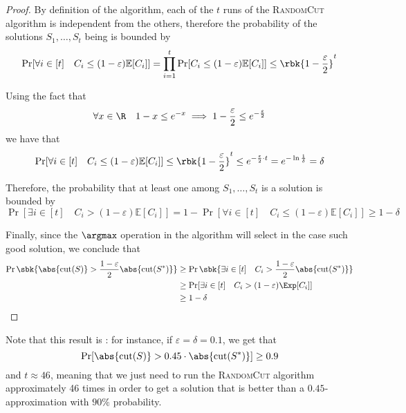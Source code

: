 \documentclass[a4paper, 12pt]{report}
\begin{document}
\begin{proof}
        By definition of the algorithm, each of the $t$ runs of the \textsc{RandomCut} algorithm is independent from the others, therefore the probability of  the solutions $S_1, \ldots, S_t$ being  is bounded by $$\Pr[\forall i \in [t]  \quad C_i \le (1 - \varepsilon) \mathbb E [C_i]] = \prod_{i = 1}^t{\Pr[C_i \le (1 - \varepsilon)\mathbb E[C_i]]} \le \rbk{1 - \dfrac{\varepsilon}{2}}^t$$

        Using the fact that $$\forall x \in \R \quad 1 - x \le e^{-x} \implies 1 - \frac{\varepsilon}{2} \le e^{- \frac{\varepsilon}{2}}$$ we have that $$\Pr[\forall i \in [t] \quad C_i \le (1 - \varepsilon) \mathbb E[C_i]] \le \rbk{1 - \dfrac{\varepsilon}{2}}^t \le e^{- \frac{\varepsilon}{2} \cdot t} = e^{- \ln {\frac{1}{\delta}}} = \delta$$

        Therefore, the probability that at least one among $S_1, \ldots, S_t$ is a  solution is bounded by $$\Pr[\exists i \in [t] \quad C_i > (1 - \varepsilon) \mathbb E [C_i]] = 1 - \Pr[\forall i \in [t] \quad C_i \le (1 - \varepsilon) \mathbb E [C_i]] \ge 1 - \delta$$

        Finally, since the $\argmax$ operation in the algorithm will select in the  case such good solution, we conclude that
        \begin{equation*}
            \begin{split}
                \Pr \sbk{\abs{\mathrm{cut}(S)} > \dfrac{1 - \varepsilon}{2} \abs{\mathrm{cut}(S^*)}} &\ge \Pr \sbk {\exists i \in [t] \quad C_i > \dfrac{1 - \varepsilon}{2} \abs{\mathrm{cut}(S^*)}} \\
                                                                                                     &\ge \Pr[\exists i \in [t] \quad C_i > (1 - \varepsilon) \Exp[C_i]] \\
                                                                                                     &\ge 1 - \delta
            \end{split}
        \end{equation*}
    \end{proof}

    Note that this result is : for instance, if $\varepsilon = \delta = 0.1$, we get that $$\Pr[\abs{\mathrm{cut}(S)} > 0.45 \cdot \abs{\mathrm{cut}(S^*)}] \ge 0.9$$ and $t \approx 46$, meaning that we just need to run the \textsc{RandomCut} algorithm approximately 46 times in order to get a solution that is better than a $0.45$-approximation with $90\%$ probability.
\end{document}
